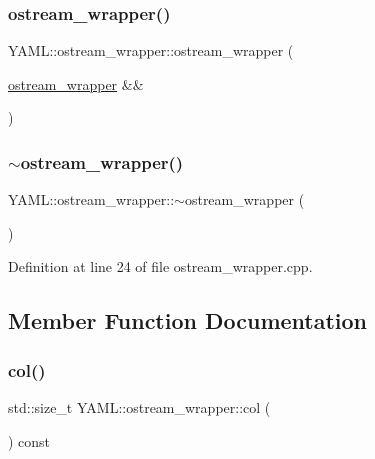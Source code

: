 \subsubsection{\texorpdfstring{ostream\_wrapper()}{ostream\_wrapper()}\hspace{0.1cm}{\footnotesize\ttfamily [4/4]}}
{\footnotesize\ttfamily Y\+A\+M\+L\+::ostream\+\_\+wrapper\+::ostream\+\_\+wrapper (\begin{DoxyParamCaption}\item[{\mbox{\hyperlink{class_y_a_m_l_1_1ostream__wrapper}{ostream\+\_\+wrapper}} \&\&}]{ }\end{DoxyParamCaption})\hspace{0.3cm}{\ttfamily [delete]}}

\mbox{\label{class_y_a_m_l_1_1ostream__wrapper_ab4d0c630394c7062c85bb44e052feb18}} 
\subsubsection{\texorpdfstring{$\sim$ostream\_wrapper()}{~ostream\_wrapper()}}
{\footnotesize\ttfamily Y\+A\+M\+L\+::ostream\+\_\+wrapper\+::$\sim$ostream\+\_\+wrapper (\begin{DoxyParamCaption}{ }\end{DoxyParamCaption})}



Definition at line 24 of file ostream\+\_\+wrapper.\+cpp.



\subsection{Member Function Documentation}
\mbox{\label{class_y_a_m_l_1_1ostream__wrapper_a41f5e634e6595d585fdf6607695ff089}} 
\subsubsection{\texorpdfstring{col()}{col()}}
{\footnotesize\ttfamily std\+::size\+\_\+t Y\+A\+M\+L\+::ostream\+\_\+wrapper\+::col (\begin{DoxyParamCaption}{ }\end{DoxyParamCaption}) const\hspace{0.3cm}{\ttfamily [inline]}}



